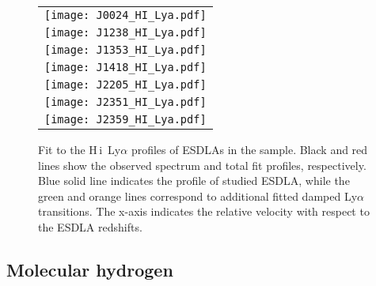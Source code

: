 \documentclass[fleqn,usenatbib,useAMS]{mnras}
\newcommand{\HI}{H\,{\sc i}}
\begin{document}
\begin{figure}
\centering
    \renewcommand{\arraystretch}{0}
    \begin{tabular}{c}
    \texttt{[image: J0024\_HI\_Lya.pdf]}
    \\
    \texttt{[image: J1238\_HI\_Lya.pdf]}
    \\
    \texttt{[image: J1353\_HI\_Lya.pdf]}
    \\
    \texttt{[image: J1418\_HI\_Lya.pdf]}
    \\
    \texttt{[image: J2205\_HI\_Lya.pdf]}
    \\
    \texttt{[image: J2351\_HI\_Lya.pdf]}
    \\
    \texttt{[image: J2359\_HI\_Lya.pdf]}
    \\
    \end{tabular}
    \renewcommand{\arraystretch}{0}
\caption{Fit to the \HI\ Ly$\alpha$ profiles of ESDLAs in the sample. Black and red lines show the observed spectrum and total fit profiles, respectively. Blue solid line indicates the profile of studied ESDLA, while the green and orange lines correspond to additional fitted damped Ly$\alpha$ transitions. The x-axis indicates the relative velocity with respect to the ESDLA redshifts.
\label{fig:HI}}
\end{figure}


\subsection{Molecular hydrogen}\label{subsec:molecular_hydrogen}
\end{document}
